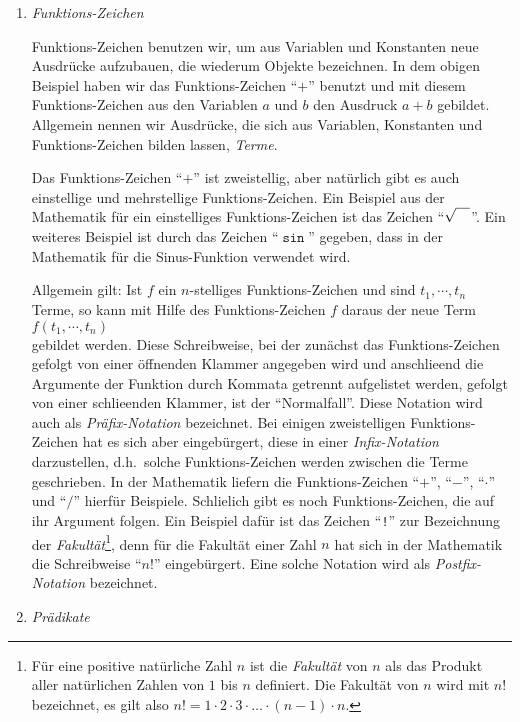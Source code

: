 \begin{enumerate}
\item \emph{Funktions-Zeichen}

      Funktions-Zeichen benutzen wir, um aus Variablen und Konstanten neue Ausdr\"{u}cke aufzubauen,
      die wiederum Objekte bezeichnen.  In dem obigen Beispiel haben wir das Funktions-Zeichen
      ``$+$'' benutzt und mit diesem Funktions-Zeichen aus den Variablen $a$ und $b$ den Ausdruck $a+b$
      gebildet.  Allgemein nennen wir Ausdr\"{u}cke, die sich aus Variablen, Konstanten und Funktions-Zeichen 
      bilden lassen, \emph{Terme}.  

      Das Funktions-Zeichen ``$+$'' ist zweistellig, aber nat\"{u}rlich gibt es auch einstellige und
      mehrstellige Funktions-Zeichen. Ein Beispiel aus der Mathematik f\"{u}r ein einstelliges Funktions-Zeichen ist 
      das Zeichen ``$\sqrt{\rule{0pt}{9pt}\quad}$''.  Ein weiteres Beispiel
      ist durch das Zeichen ``$\mathtt{\sin}$'' gegeben, dass in der Mathematik f\"{u}r die
      Sinus-Funktion verwendet wird.

      Allgemein gilt: Ist $f$ ein $n$-stelliges Funktions-Zeichen und sind 
       $t_1, \cdots, t_n$ Terme,
      so kann mit Hilfe des Funktions-Zeichen $f$  daraus der neue Term \\[0.2cm]
      \hspace*{1.3cm} $f(t_1,\cdots,t_n)$ \\[0.2cm]
      gebildet werden.  Diese Schreibweise, bei der zun\"{a}chst das Funktions-Zeichen
      gefolgt von einer \"{o}ffnenden Klammer angegeben wird und anschlie\3end die Argumente
      der Funktion durch Kommata getrennt aufgelistet werden, gefolgt von einer
      schlie\3enden Klammer, ist der ``Normalfall''.  Diese Notation wird auch als \emph{Pr\"{a}fix-Notation}
      bezeichnet. Bei einigen zweistelligen Funktions-Zeichen hat es sich aber eingeb\"{u}rgert, diese in einer
      \emph{Infix-Notation} darzustellen, d.h.~solche Funktions-Zeichen werden zwischen
      die Terme geschrieben. In der Mathematik liefern die  Funktions-Zeichen ``$+$'',
      ``$-$'', ``$\cdot $'' und ``$/$'' hierf\"{u}r Beispiele.  Schlie\3lich gibt es noch Funktions-Zeichen,
      die auf ihr Argument folgen.  Ein Beispiel daf\"{u}r ist das Zeichen ``\texttt{!}'' zur
      Bezeichnung der \emph{Fakult\"{a}t}\footnote{
      F\"{u}r eine positive nat\"{u}rliche Zahl $n$ ist die \emph{Fakult\"{a}t} von $n$ als das Produkt aller
      nat\"{u}rlichen Zahlen von $1$ bis $n$ definiert.  Die Fakult\"{a}t von $n$ wird mit $n!$ bezeichnet, 
      es gilt also $n! = 1 \cdot 2 \cdot 3 \cdot \dots \cdot (n-1) \cdot n$.},
      denn f\"{u}r die Fakult\"{a}t einer Zahl $n$ hat sich in der Mathematik
      die Schreibweise ``$n!$'' eingeb\"{u}rgert.  Eine solche Notation wird als \emph{Postfix-Notation}
      bezeichnet.
\item \emph{Pr\"{a}dikate}


\end{enumerate}
